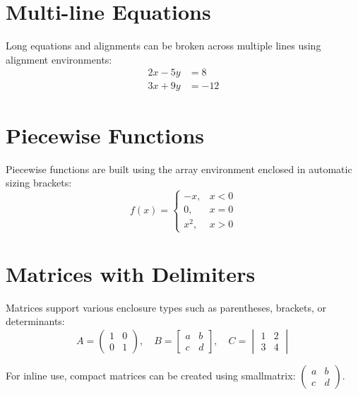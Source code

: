 \documentclass[12pt]{article}
\begin{document}
\section*{Multi-line Equations}
Long equations and alignments can be broken across multiple lines using alignment environments:
\begin{align}
2x - 5y &= 8 \\
3x + 9y &= -12
\end{align}

\section*{Piecewise Functions}
Piecewise functions are built using the array environment enclosed in automatic sizing brackets:
\[
f(x) = \left\{
\begin{array}{ll}
-x, & x < 0 \\
0, & x = 0 \\
x^2, & x > 0
\end{array}
\right.
\]

\section*{Matrices with Delimiters}
Matrices support various enclosure types such as parentheses, brackets, or determinants:
\[
A = \begin{pmatrix}
1 & 0 \\
0 & 1 
\end{pmatrix}, \quad
B = \begin{bmatrix}
a & b \\
c & d 
\end{bmatrix}, \quad
C = \begin{vmatrix}
1 & 2 \\
3 & 4 
\end{vmatrix}
\]

For inline use, compact matrices can be created using smallmatrix: $\left( \begin{smallmatrix} a & b \\ c & d \end{smallmatrix} \right)$.
\end{document}

